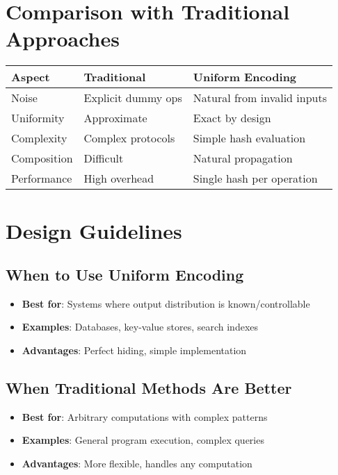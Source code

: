 \documentclass[11pt,final,hidelinks]{article}
\begin{document}
\section{Comparison with Traditional Approaches}

\begin{center}
\begin{tabular}{lll}
\textbf{Aspect} & \textbf{Traditional} & \textbf{Uniform Encoding} \\
\hline
Noise & Explicit dummy ops & Natural from invalid inputs \\
Uniformity & Approximate & Exact by design \\
Complexity & Complex protocols & Simple hash evaluation \\
Composition & Difficult & Natural propagation \\
Performance & High overhead & Single hash per operation \\
\end{tabular}
\end{center}

\section{Design Guidelines}

\subsection{When to Use Uniform Encoding}

\begin{itemize}
    \item \textbf{Best for}: Systems where output distribution is known/controllable
    \item \textbf{Examples}: Databases, key-value stores, search indexes
    \item \textbf{Advantages}: Perfect hiding, simple implementation
\end{itemize}

\subsection{When Traditional Methods Are Better}

\begin{itemize}
    \item \textbf{Best for}: Arbitrary computations with complex patterns
    \item \textbf{Examples}: General program execution, complex queries
    \item \textbf{Advantages}: More flexible, handles any computation
\end{itemize}
\end{document}
